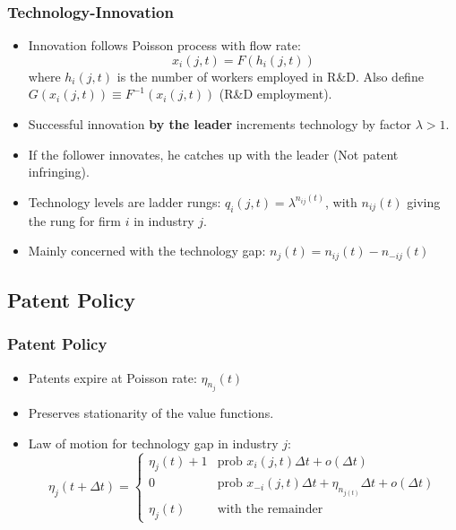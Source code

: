 \documentclass{beamer}
\begin{document}
\begin{frame}[t]\frametitle{Technology-Innovation} 
  \begin{itemize}
    \item<+-> Innovation follows Poisson process with flow rate:
      \begin{equation*} \label{eq:tech_rd_technology}
        x_i(j, t) = F(h_i(j, t))
      \end{equation*}
      where $h_i(j, t)$ is the number of workers employed in R\&D.
      Also define $G(x_i(j,t)) \equiv F^{-1}(x_i(j,t))$ (R\&D employment).
    \item<+-> Successful innovation \textbf{by the leader} increments technology by factor $\lambda > 1$.
    \item<+-> If the follower innovates, he catches up with the leader (Not patent infringing).
    \item<+-> Technology levels are ladder rungs: $q_i(j, t) = \lambda^{n_{ij}(t)}$, with $n_{ij}(t)$ giving the rung for firm $i$ in industry $j$.
    \item<+-> Mainly concerned with the technology gap: $n_j(t) = n_{ij}(t) - n_{-ij}(t)$
  \end{itemize}
\end{frame}

\subsection{Patent Policy}
\label{sub:patent_policy}

\begin{frame}[t]\frametitle{Patent Policy}
  \begin{itemize}
    \item<+-> Patents expire at Poisson rate: $\eta_{n_j}(t)$
    \item<+-> Preserves stationarity of the value functions.
    \item<+-> Law of motion for technology gap in industry $j$:
      \begin{equation*} \label{eq:tech_law_of_motion}
        \eta_j(t + \Delta t) =
        \begin{cases}
          \eta_j(t) + 1 & \textrm{prob } x_i(j,t)\Delta t + o(\Delta t)\\
          0 & \textrm{prob } x_{-i}(j,t)\Delta t + \eta_{n_{j(t)}}\Delta t + o(\Delta t) \\
          \eta_j(t) & \textrm{with the remainder} 
        \end{cases}
      \end{equation*}
  \end{itemize}
\end{frame}
\end{document}
